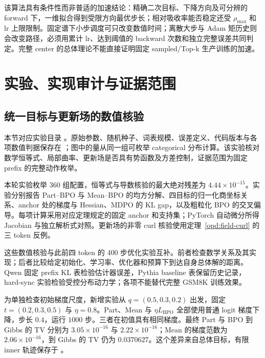 \documentclass[lang=cn,scheme=chinese,openany]{../book/elegantbook}
\begin{document}
该算法具有条件性而非普适的加速结论：精确二次目标、下降方向及可分辨的 forward 下，一维拟合得到受限方向最优步长；相对吸收率能否稳定还受 $\rho_{\max}$ 和 lr 上限限制。固定谱下小步调度可只改变数值时间；离散大步与 Adam 矩历史则会改变路径，必须用累计 lr、达到阈值的 backward 次数和独立完整误差共同判定。完整 center 的总体理论不能直接证明固定 sampled/Top-k 生产训练的加速。





\chapter{实验、实现审计与证据范围}
\label{evidence:chapter}

\section{统一目标与更新场的数值核验}
\label{evidence:reconstruction}

本节对应实验目录 。原始参数、随机种子、词表规模、误差定义、代码版本与各项数值判据保存在 ；图中的量从同一组可枚举 categorical 分布计算。该实验核对数学恒等式、局部曲率、更新场是否具有势函数及方差控制，证据范围为固定 prefix 的完整动作枚举。

本轮实验枚举 $360$ 组配置，恒等式与导数核验的最大绝对残差为 $4.44\times10^{-15}$。实验分别报告 Part--BPO 与 Mean--BPO 的均方分解、四目标的归一化商坐标关系、anchor 处的梯度与 Hessian、MDPO 的 KL gap，以及粗粒化 BPO 的交叉偏导。每项计算采用对应定理规定的固定 anchor 和支持集；PyTorch 自动微分所得 Jacobian 与独立解析式对照。更新场的非零 curl 核验使用定理~\ref{opd:field-curl} 的三 token 反例。

这些数值核验与此前四 token 的 400 步优化实验互补。前者检查数学关系及其实现；后者比较给定初始化、学习率、优化器和预算下到达自身总体解的距离。Qwen 固定 prefix KL 表检验估计器误差，Pythia baseline 表保留历史记录，hard-sync 实验检验受控分布动力学；各项不能替代完整 GSM8K 训练效果。

为单独检查初始梯度尺度，新增实验从 $q=(0.5,0.3,0.2)$ 出发，固定 $t=(0.2,0.3,0.5)$ 与 $\eta=0.8$。Part、Mean 与 $\eta L_{\mathrm{BPO}}$ 全部使用普通 logit 梯度下降，步长 $0.4$，运行 $1000$ 步。三者在初值具有相同梯度。最终 Part 与 BPO 到 Gibbs 的 TV 分别为 $3.05\times10^{-16}$ 与 $2.22\times10^{-16}$；Mean 的梯度范数为 $2.06\times10^{-16}$，到 Gibbs 的 TV 仍为 $0.0370627$。这个差异来自总体目标，有限 inner 轨迹保存于 。
\end{document}
